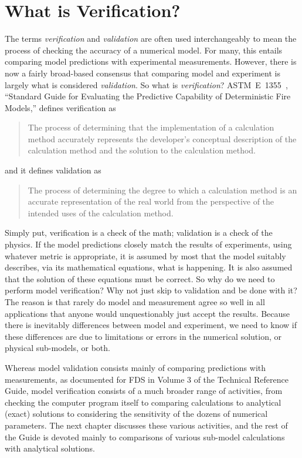 \documentclass[11pt]{book}
\begin{document}
\cleardoublepage
{}
{}
\listoffigures

\cleardoublepage
{}
{}
\listoftables

\mainmatter


\chapter{What is Verification?}

The terms {\em verification} and {\em validation} are often used interchangeably to mean the process of checking the
accuracy of a numerical model. For many, this entails comparing model predictions with experimental measurements. However,
there is now a fairly broad-based consensus that comparing model and experiment is largely what is considered {\em validation}. So what is
{\em verification}? ASTM~E~1355~\cite{ASTM:E1355}, ``Standard Guide for
Evaluating the Predictive Capability of Deterministic Fire Models,'' defines verification as
\begin{quote}
The process of determining that the implementation of a calculation method accurately
represents the developer's conceptual description of the calculation method and the solution to the calculation method.
\end{quote}
and it defines validation as
\begin{quote}
The process of determining the degree to which a calculation method is an accurate representation of the real world
from the perspective of the intended uses of the calculation method.
\end{quote}
Simply put, verification is a check of the math; validation is a check of the physics. If the model predictions closely match
the results of experiments, using whatever metric is appropriate, it is assumed by most that the model suitably describes, via
its mathematical equations, what is happening. It is also assumed that the solution of these equations must be correct. So why do
we need to perform model verification? Why not just skip to validation and be done with it? The reason is that rarely do model and
measurement agree so well in all applications that anyone would unquestionably just accept the results. Because there is
inevitably differences between model and experiment, we need to know if these differences are due to limitations or errors in
the numerical solution, or physical sub-models, or both.

Whereas model validation consists mainly of comparing predictions with measurements, as documented for FDS in Volume 3 of the
Technical Reference Guide, model verification consists of a much broader range of activities, from checking the computer program
itself to comparing calculations to analytical (exact) solutions to considering the sensitivity of the dozens of numerical
parameters. The next chapter discusses these various activities, and the rest of the Guide is devoted mainly to comparisons of
various sub-model calculations with analytical solutions.
\end{document}
